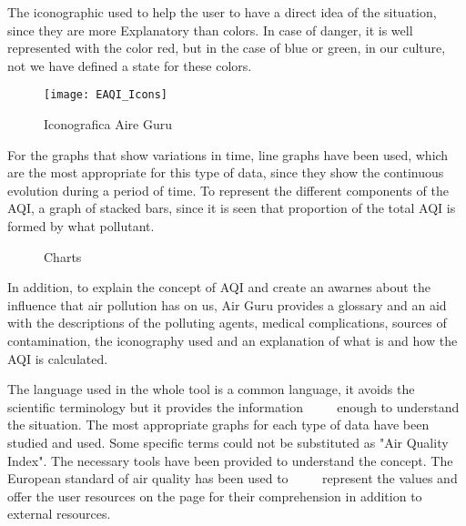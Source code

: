 The iconographic used to help the user to have a direct idea of the situation, since they are more
Explanatory than colors. In case of danger, it is well represented with the color red, but in the case of blue or green, in our culture, not
we have defined a state for these colors. \\
\begin{figure}[ht]
    \centering
    \texttt{[image: EAQI\_Icons]}
    \caption{Iconografica Aire Guru}
\end{figure}

For the graphs that show variations in time, line graphs have been used, which are the most appropriate for this type of data,
since they show the continuous evolution during a period of time. To represent the different components of the AQI, a
graph of stacked bars, since it is seen that proportion of the total AQI is formed by what pollutant. \\
\begin{figure}[ht]
    \centering
     \hfill
 
    \caption{Charts}
\end{figure}

In addition, to explain the concept of AQI and create an awarnes about the influence that air pollution has on us, Air Guru provides a
glossary and an aid with the descriptions of the polluting agents, medical complications, sources of contamination, the iconography used and
an explanation of what is and how the AQI is calculated. \\

 
\begin{itemize}
    \done The language used in the whole tool is a common language, it avoids the scientific terminology but it provides the information
         enough to understand the situation.
    \done The most appropriate graphs for each type of data have been studied and used.
    \crossed Some specific terms could not be substituted as "Air Quality Index".
    \done The necessary tools have been provided to understand the concept. The European standard of air quality has been used to
         represent the values and offer the user resources on the page for their comprehension in addition to external resources.
\end{itemize}
 

\newpage